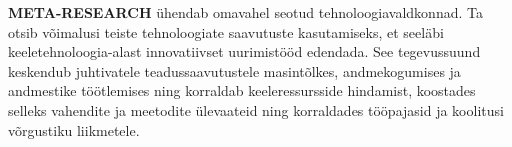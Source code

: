 \documentclass[]{../metanetpaper}
\begin{document}
\begin{multicols}{2}
\textbf{META-RESEARCH} ühendab omavahel seotud tehnoloogiavaldkonnad. Ta otsib võimalusi teiste tehnoloogiate saavutuste kasutamiseks, et seeläbi keeletehnoloogia-alast innovatiivset uurimistööd edendada. See tegevussuund keskendub juhtivatele teadussaavutustele masintõlkes, andmekogumises ja andmestike töötlemises ning korraldab keeleressursside hindamist, koostades selleks vahendite ja meetodite ülevaateid ning korraldades tööpajasid ja koolitusi võrgustiku liikmetele. 

\end{multicols}



\cleardoublepage


\end{document}
